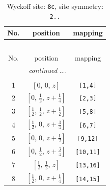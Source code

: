 \documentclass[fleqn,8pt]{jsarticle}
\begin{document}
\begin{longtable}{ccc}
\caption{Wyckoff site: {\tt 8c}, site symmetry: {\tt 2..}}
 \\
 \hline \hline
No. & position & mapping \\ \hline \endfirsthead

\multicolumn{2}{l}{\tablename\ \thetable{}} \\
 \hline \hline
No. & position & mapping \\ \hline \endhead

 \hline \hline
\multicolumn{2}{r}{\footnotesize\it continued ...} \\ \endfoot

 \hline \hline
\multicolumn{2}{r}{} \\ \endlastfoot

1 & $\left[ 0,\, 0,\, z \right]$ & {\tt [1,4]} \\ \hline
2 & $\left[ 0,\, \frac{1}{2},\, z + \frac{1}{4} \right]$ & {\tt [2,3]} \\ \hline
3 & $\left[ \frac{1}{2},\, \frac{1}{2},\, z + \frac{1}{2} \right]$ & {\tt [5,8]} \\ \hline
4 & $\left[ \frac{1}{2},\, 0,\, z + \frac{3}{4} \right]$ & {\tt [6,7]} \\ \hline
5 & $\left[ 0,\, 0,\, z + \frac{1}{2} \right]$ & {\tt [9,12]} \\ \hline
6 & $\left[ 0,\, \frac{1}{2},\, z + \frac{3}{4} \right]$ & {\tt [10,11]} \\ \hline
7 & $\left[ \frac{1}{2},\, \frac{1}{2},\, z \right]$ & {\tt [13,16]} \\ \hline
8 & $\left[ \frac{1}{2},\, 0,\, z + \frac{1}{4} \right]$ & {\tt [14,15]} \\
\end{longtable}
\renewcommand{\arraystretch}{1.2}
\end{document}
